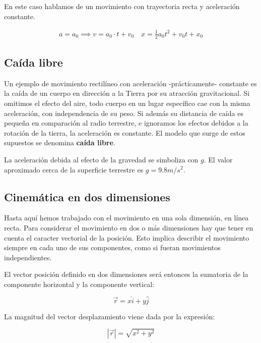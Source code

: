 En este caso hablamos de un movimiento con trayectoria recta y aceleración 
constante.

\begin{align*}
    a = a_0 \implies v = a_0 \cdot t + v_0 \quad x = \frac{1}{2}a_{0}t^{2} + v_{0}t + x_0
\end{align*}

\subsection{Caída libre}

Un ejemplo de movimiento rectilíneo con aceleración -prácticamente- constante es 
la caída de un cuerpo en dirección a la Tierra por su atracción gravitacional.
Si omitimos el efecto del aire,
todo cuerpo en un lugar específico cae con la misma aceleración,
con independencia de su peso.
Si además su distancia de caída es pequeña en comparación al radio terrestre,
e ignoramos los efectos debidos a la rotación de la tierra,
la aceleración es constante.
El modelo que surge de estos supuestos se denomina \textbf{caída libre}.

La aceleración debida al efecto de la gravedad se simboliza con \(g\).
El valor aproximado cerca de la superficie terrestre es \(g = 9.8 m/s^{2}\).

\subsection{Cinemática en dos dimensiones}

Hasta aquí hemos trabajado con el movimiento en una sola dimensión,
en línea recta.
Para considerar el movimiento en dos o más dimensiones hay que tener en cuenta 
el caracter vectorial de la posición.
Esto implica describir el movimiento siempre en cada uno de sus componentes,
como si fueran movimientos independientes.

El vector posición definido en dos dimensiones será entonces la sumatoria de la 
componente horizontal y la componente vertical:

\begin{equation*}
    \vec{r} = x\hat{i} + y\hat{j}
\end{equation*}

La magnitud del vector desplazamiento viene dada por la expresión:

\begin{equation*}
    |\vec{r}| = \sqrt{x^{2} + y^{2}}
\end{equation*}

